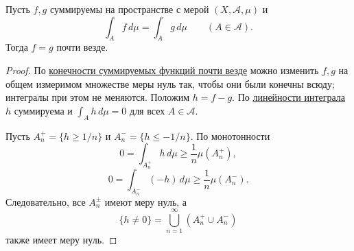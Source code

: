 \label{ticket:32}

\begin{lemma}
Пусть $f,g$ суммируемы на пространстве с мерой $(X,\mathcal A,\mu)$ и
\[
  \int_A f\,d\mu=\int_A g\,d\mu\qquad(A\in\mathcal A).
\]
Тогда $f=g$ почти везде.
\end{lemma}

\begin{proof}
По \hyperref[ticket:28]{конечности суммируемых функций почти везде} можно изменить $f,g$ на общем измеримом множестве меры нуль так, чтобы они были конечны всюду; интегралы при этом не меняются.
Положим $h=f-g$.
По \hyperref[ticket:36]{линейности интеграла} $h$ суммируема и $\int_A h\,d\mu=0$ для всех $A\in\mathcal A$.

Пусть $A_n^+=\{h\ge1/n\}$ и $A_n^-=\{h\le-1/n\}$.
По монотонности
\[
  0=\int_{A_n^+}h\,d\mu\ge\frac1n\mu(A_n^+),
\]
\[
  0=\int_{A_n^-}(-h)\,d\mu\ge\frac1n\mu(A_n^-).
\]
Следовательно, все $A_n^\pm$ имеют меру нуль, а
\[
  \{h\ne0\}=\bigcup_{n=1}^{\infty}(A_n^+\cup A_n^-)
\]
также имеет меру нуль.
\end{proof}
